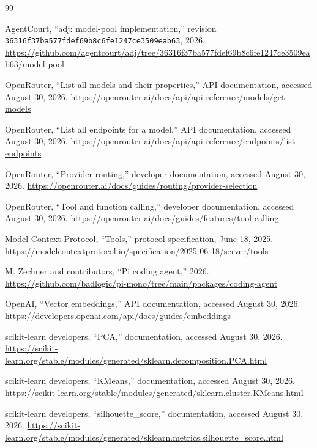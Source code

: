 \documentclass[11pt]{article}
\newcommand{\code}[1]{\texttt{#1}}
\begin{document}
\begin{thebibliography}{99}

AgentCourt, ``adj: model-pool implementation,'' revision \code{36316f37ba577fdef69b8c6fe1247ce3509eab63}, 2026.  \url{https://github.com/agentcourt/adj/tree/36316f37ba577fdef69b8c6fe1247ce3509eab63/model-pool}

OpenRouter, ``List all models and their properties,'' API documentation, accessed August 30, 2026.  \url{https://openrouter.ai/docs/api/api-reference/models/get-models}

OpenRouter, ``List all endpoints for a model,'' API documentation, accessed August 30, 2026.  \url{https://openrouter.ai/docs/api/api-reference/endpoints/list-endpoints}

OpenRouter, ``Provider routing,'' developer documentation, accessed August 30, 2026.  \url{https://openrouter.ai/docs/guides/routing/provider-selection}

OpenRouter, ``Tool and function calling,'' developer documentation, accessed August 30, 2026.  \url{https://openrouter.ai/docs/guides/features/tool-calling}

Model Context Protocol, ``Tools,'' protocol specification, June 18, 2025.  \url{https://modelcontextprotocol.io/specification/2025-06-18/server/tools}

M. Zechner and contributors, ``Pi coding agent,'' 2026.  \url{https://github.com/badlogic/pi-mono/tree/main/packages/coding-agent}

OpenAI, ``Vector embeddings,'' API documentation, accessed August 30, 2026.  \url{https://developers.openai.com/api/docs/guides/embeddings}

scikit-learn developers, ``PCA,'' documentation, accessed August 30, 2026.  \url{https://scikit-learn.org/stable/modules/generated/sklearn.decomposition.PCA.html}

scikit-learn developers, ``KMeans,'' documentation, accessed August 30, 2026.  \url{https://scikit-learn.org/stable/modules/generated/sklearn.cluster.KMeans.html}

scikit-learn developers, ``silhouette\_score,'' documentation, accessed August 30, 2026.  \url{https://scikit-learn.org/stable/modules/generated/sklearn.metrics.silhouette_score.html}

\end{thebibliography}
\end{document}
